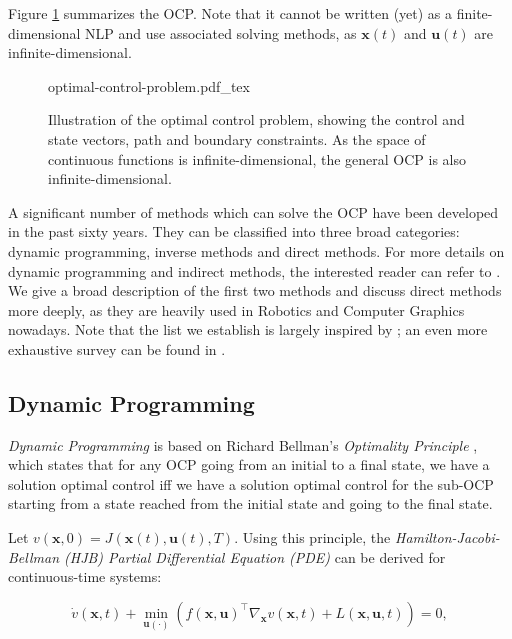 Figure \ref{fig:chap3-optimal-control-problem} summarizes the
OCP. Note that it cannot be written (yet) as a finite-dimensional NLP
and use associated solving methods, as $\mathbf{x}(t)$ and
$\mathbf{u}(t)$ are infinite-dimensional.

\begin{figure}
  \centering
      {\def\svgwidth{0.9\linewidth}
        
                   {optimal-control-problem.pdf_tex}
      }
      \caption{Illustration of the optimal control problem, showing
        the control and state vectors, path and boundary
        constraints. As the space of continuous functions is
        infinite-dimensional, the general OCP is also
        infinite-dimensional.}
      \label{fig:chap3-optimal-control-problem}
\end{figure}

A significant number of methods which can solve the OCP have been
developed in the past sixty years. They can be classified into three
broad categories: dynamic programming, inverse methods and direct
methods. For more details on dynamic programming and indirect methods,
the interested reader can refer to \cite{laumond1998robot,
  todorov2006optimal}. We give a broad description of the first two
methods and discuss direct methods more deeply, as they are heavily
used in Robotics and Computer Graphics nowadays. Note that the list we
establish is largely inspired by \cite{diehl2006fast}; an even more
exhaustive survey can be found in
\cite{betts1998survey,betts2010practical}.

\subsection{Dynamic Programming}

\emph{Dynamic Programming} is based on Richard Bellman's
\emph{Optimality Principle} \cite{bellman1965dynamic}, which states
that for any OCP going from an initial to a final state, we have a
solution optimal control iff we have a solution optimal control for
the sub-OCP starting from a state reached from the initial state and
going to the final state.

Let $v(\mathbf{x},0) = J(\mathbf{x}(t),\mathbf{u}(t),T)$. Using this
principle, the \emph{Hamilton-Jacobi-Bellman (HJB) Partial
  Differential Equation (PDE)} can be derived for continuous-time
systems:

\begin{equation}
\label{eq:chap3-hjb}
\dot{v}(\mathbf{x},t) + \min_{\mathbf{u} (\cdot)}\left(f(\mathbf{x},
\mathbf{u})^{\top}\nabla_{\mathbf{x}} v(\mathbf{x},t) + L (\mathbf{x},
\mathbf{u},t)\right) = 0,
\end{equation}

